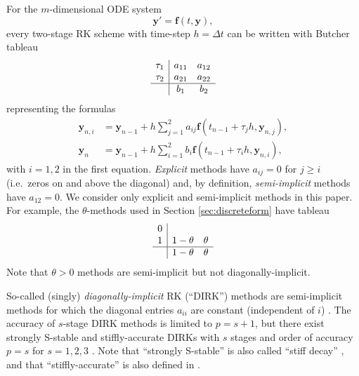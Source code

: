 \documentclass[final,leqno,onefignum,onetabnum]{siamltex1213bueler}
\newcommand\bbf{\mathbf{f}}
\newcommand\by{\mathbf{y}}
\begin{document}
For the $m$-dimensional ODE system
\begin{equation}
  \by' = \bbf(t,\by),  \label{eq:abstractODE}
\end{equation}
every two-stage RK scheme with time-step $h=\Delta t$ can be written with Butcher tableau \cite{AscherPetzold}
\begin{equation}
\begin{array}{c|cc}
\tau_1 & a_{11} & a_{12}  \\
\tau_2 & a_{21} & a_{22}  \\ \hline
       & b_1    & b_2     \\
\end{array}  \label{eq:tableau}
\end{equation}
representing the formulas
\begin{align*}
  \by_{n,i} &= \by_{n-1} + h \sum_{j=1}^2 a_{ij} \bbf(t_{n-1} + \tau_j h, \by_{n,j}), \\
      \by_n &= \by_{n-1} + h \sum_{i=1}^2 b_i \bbf(t_{n-1} + \tau_i h, \by_{n,i}),
\end{align*}
with $i=1,2$ in the first equation.  \emph{Explicit} methods have $a_{ij}=0$ for $j\ge i$ (i.e.~zeros on and above the diagonal) and, by definition, \emph{semi-implicit} methods have $a_{12}=0$.  We consider only explicit and semi-implicit methods in this paper.  For example, the $\theta$-methods used in Section \ref{sec:discreteform} have tableau
\begin{equation*}
\begin{array}{c|cc}
0 &          &   \\
1 & 1-\theta & \theta  \\ \hline
  & 1-\theta & \theta  \\
\end{array}
\end{equation*}
Note that $\theta>0$ methods are semi-implicit but not diagonally-implicit.

So-called (singly) \emph{diagonally-implicit} RK (``DIRK'') methods are semi-implicit methods for which the diagonal entries $a_{ii}$ are constant (independent of $i$) \cite{AscherPetzold}.  The accuracy of $s$-stage DIRK methods is limited to $p=s+1$, but there exist strongly S-stable and stiffly-accurate DIRKs with $s$ stages and order of accuracy $p=s$ for $s=1,2,3$ \cite{Alexander1977}.  Note that ``strongly S-stable'' is also called ``stiff decay'' \cite{AscherPetzold}, and that ``stiffly-accurate'' is also defined in \cite{AscherPetzold}.
\end{document}
